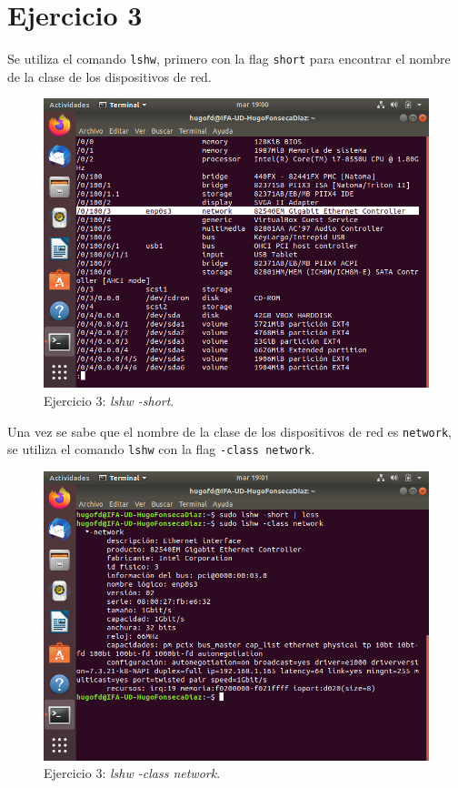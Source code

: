 \documentclass[11pt]{article}
\begin{document}
\section{Ejercicio 3}
Se utiliza el comando \verb|lshw|, primero con la flag \verb|short| para encontrar el nombre de la clase de los dispositivos de red.

\begin{figure}[H]
    \caption{Ejercicio 3: \textit{lshw -short}.}
  \centering
  \includegraphics{e3-1.png}
\end{figure}

Una vez se sabe que el nombre de la clase de los dispositivos de red es \verb|network|, se utiliza el comando \verb|lshw| con la flag \verb|-class network|.

\begin{figure}[H]
    \caption{Ejercicio 3: \textit{lshw -class network}.}
  \centering
  \includegraphics{e3-2.png}
\end{figure}
\end{document}
